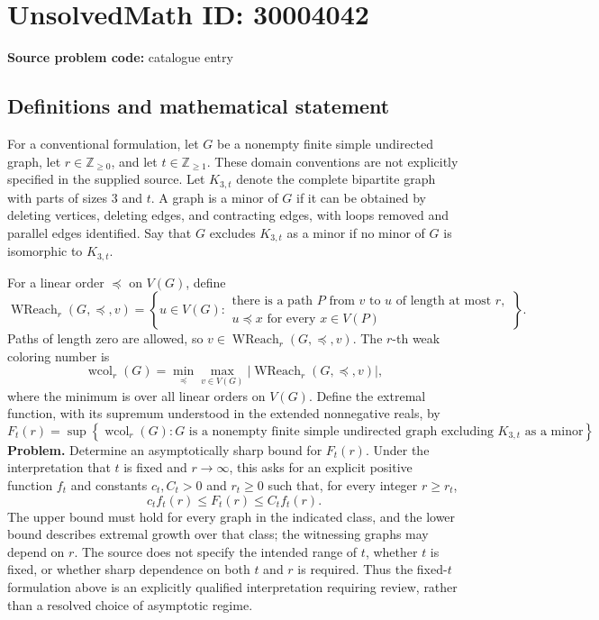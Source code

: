\documentclass[11pt]{article}
\newcommand{\Z}{\mathbb{Z}}
\begin{document}
\section*{UnsolvedMath ID: 30004042}
\textbf{Source problem code:} catalogue entry
\subsection{Definitions and mathematical statement}
For a conventional formulation, let \(G\) be a nonempty finite simple undirected graph, let \(r\in\Z_{\geq 0}\), and let \(t\in\Z_{\geq 1}\). These domain conventions are not explicitly specified in the supplied source. Let \(K_{3,t}\) denote the complete bipartite graph with parts of sizes \(3\) and \(t\). A graph is a minor of \(G\) if it can be obtained by deleting vertices, deleting edges, and contracting edges, with loops removed and parallel edges identified. Say that \(G\) excludes \(K_{3,t}\) as a minor if no minor of \(G\) is isomorphic to \(K_{3,t}\).

For a linear order \(\preceq\) on \(V(G)\), define
\[
\operatorname{WReach}_r(G,\preceq,v)
=\left\{u\in V(G):\begin{array}{l}\text{there is a path }P\text{ from }v\text{ to }u\text{ of length at most }r,\\ u\preceq x\text{ for every }x\in V(P)\end{array}\right\}.
\]
Paths of length zero are allowed, so \(v\in\operatorname{WReach}_r(G,\preceq,v)\). The \(r\)-th weak coloring number is
\[
\operatorname{wcol}_r(G)
=\min_{\preceq}\max_{v\in V(G)}
\bigl|\operatorname{WReach}_r(G,\preceq,v)\bigr|,
\]
where the minimum is over all linear orders on \(V(G)\). Define the extremal function, with its supremum understood in the extended nonnegative reals, by
\[
F_t(r)=\sup\left\{\operatorname{wcol}_r(G):G\text{ is a nonempty finite simple undirected graph excluding }K_{3,t}\text{ as a minor}\right\}.
\]
\textbf{Problem.} Determine an asymptotically sharp bound for \(F_t(r)\). Under the interpretation that \(t\) is fixed and \(r\to\infty\), this asks for an explicit positive function \(f_t\) and constants \(c_t,C_t>0\) and \(r_t\geq 0\) such that, for every integer \(r\geq r_t\),
\[
c_t f_t(r)\leq F_t(r)\leq C_t f_t(r).
\]
The upper bound must hold for every graph in the indicated class, and the lower bound describes extremal growth over that class; the witnessing graphs may depend on \(r\). The source does not specify the intended range of \(t\), whether \(t\) is fixed, or whether sharp dependence on both \(t\) and \(r\) is required. Thus the fixed-\(t\) formulation above is an explicitly qualified interpretation requiring review, rather than a resolved choice of asymptotic regime.
\end{document}

